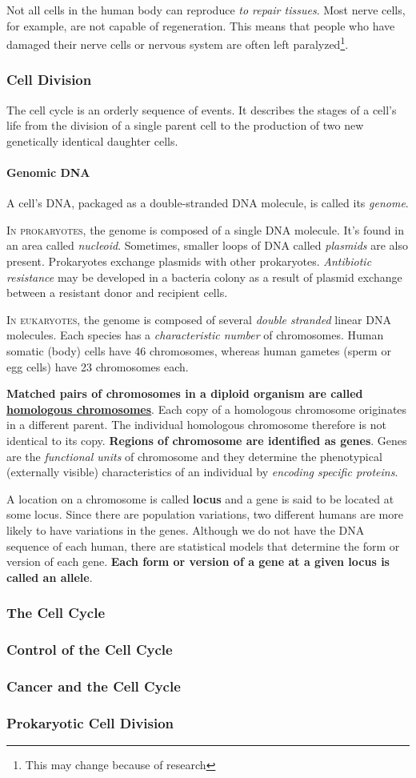 \documentclass[12pt]{article}
\begin{document}
Not all cells in the human body can reproduce \emph{to repair tissues}. Most nerve cells, for example, are not capable of regeneration. This means that people who have damaged their nerve cells or nervous system are often left paralyzed\footnote{This may change because of research}.
\subsubsection{Cell Division}
The cell cycle is an orderly sequence of events. It describes the stages of a cell's life from the division of a single parent cell to the production of two new genetically identical daughter cells.
\paragraph{Genomic DNA}
A cell's DNA, packaged as a double-stranded DNA molecule, is called its \emph{genome}. 

\lettrine[lines=2]{I}{n prokaryotes}, the genome is composed of a single DNA molecule. It's found in an area called \emph{nucleoid}. Sometimes, smaller loops of DNA called \emph{plasmids} are also present. Prokaryotes exchange plasmids with other prokaryotes. \emph{Antibiotic resistance} may be developed in a bacteria colony as a result of plasmid exchange between a resistant donor and recipient cells.

\lettrine[lines=2]{I}{n eukaryotes}, the genome is composed of several \emph{double stranded} linear DNA molecules. Each species has a \emph{characteristic number} of chromosomes. Human somatic (body) cells have 46 chromosomes, whereas human gametes (sperm or egg cells) have 23 chromosomes each.

\textbf{Matched pairs of chromosomes in a diploid organism are called \underline{homologous chromosomes}}. Each copy of a homologous chromosome originates in a different parent. The individual homologous chromosome therefore is not identical to its copy. \textbf{Regions of chromosome are identified as genes}. Genes are the \emph{functional units} of chromosome and they determine the phenotypical (externally visible) characteristics of an individual by \emph{encoding specific proteins}. 

A location on a chromosome is called \textbf{locus} and a gene is said to be located at some locus. Since there are population variations, two different humans are more likely to have variations in the genes. Although we do not have the DNA sequence of each human, there are statistical models that determine the form or version of each gene. \textbf{Each form or version of a gene at a given locus is called an allele}.
\subsubsection{The Cell Cycle}
\subsubsection{Control of the Cell Cycle}
\subsubsection{Cancer and the Cell Cycle}
\subsubsection{Prokaryotic Cell Division}
\end{document}
